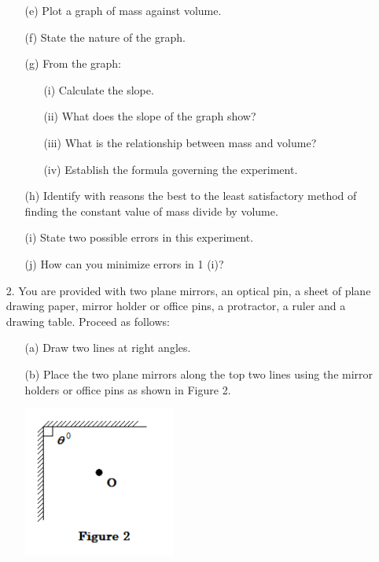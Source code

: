 \begin{enumerate}
\begin{enumerate}
\item[(e)] Plot a graph of mass against volume.
\item[(f)] State the nature of the graph.
\item[(g)] From the graph:
\begin{enumerate}
\item[(i)] Calculate the slope.
\item[(ii)] What does the slope of the graph show?
\item[(iii)] What is the relationship between mass and volume?
\item[(iv)] Establish the formula governing the experiment.
\end{enumerate}
\item[(h)] Identify with reasons the best to the least satisfactory method of finding the constant value of mass divide by volume.
\item[(i)] State two possible errors in this experiment.
\item[(j)] How can you minimize errors in 1 (i)?
\end{enumerate}

\pagebreak

\item[2.] You are provided with two plane mirrors, an optical pin, a sheet of plane drawing paper, mirror holder or office pins, a protractor, a ruler and a drawing table. Proceed as follows:
\begin{enumerate}
\item[(a)] Draw two lines at right angles.
\item[(b)] Place the two plane mirrors along the top two lines using the mirror holders or office pins as shown in Figure 2.

\begin{center}
\includegraphics[width=5cm]{./img/2012-2-alt.png}
\end{center}


\end{enumerate}
\end{enumerate}
